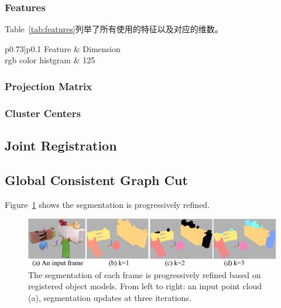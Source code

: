 \subsubsection{Features}
Table~\ref{tab:features}列举了所有使用的特征以及对应的维数。
\begin{table}[!hbp]
\begin{tabular}{p{}|{p{0.1\columnwidth}}}
\hline
Feature & Dimension\\
\hline
rgb color histgram & 125\\


\end{tabular}
\caption{Features} %
\label{tab:features}
\end{table}
\subsubsection{Projection Matrix}
\subsubsection{Cluster Centers}
\subsection{Joint Registration}
\subsection{Global Consistent Graph Cut}
Figure~\ref{fig:object-iterations} shows the segmentation is progressively refined. 
\begin{figure}
\centering
\includegraphics[width=2\columnwidth]{figures/object-iterations.png}
\caption{ The segmentation of each frame is progressively refined based on registered object models. From left to right: an input point cloud (a), segmentation updates at three iterations. }
\label{fig:object-iterations}
\end{figure}
